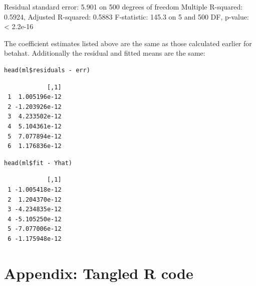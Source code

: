 \documentclass[11pt]{article}
\begin{document}
Residual standard error: 5.901 on 500 degrees of freedom
Multiple R-squared:  0.5924,    Adjusted R-squared:  0.5883 
F-statistic: 145.3 on 5 and 500 DF,  p-value: < 2.2e-16


The coefficient estimates listed above are the same as those
calculated earlier for betahat. Additionally the residual and fitted
means are the same:


\begin{verbatim}
head(ml$residuals - err)
\end{verbatim}

\begin{verbatim}
            [,1]
 1  1.005196e-12
 2 -1.203926e-12
 3  4.233502e-12
 4  5.104361e-12
 5  7.077894e-12
 6  1.176836e-12
\end{verbatim}



\begin{verbatim}
head(ml$fit - Yhat)
\end{verbatim}

\begin{verbatim}
            [,1]
 1 -1.005418e-12
 2  1.204370e-12
 3 -4.234835e-12
 4 -5.105250e-12
 5 -7.077006e-12
 6 -1.175948e-12
\end{verbatim}
\section{Appendix: Tangled R code}
\label{sec-5}




\end{document}
